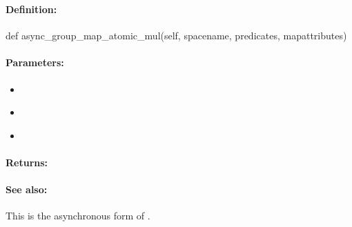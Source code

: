 \pagebreak
\subsubsection{}
\label{api:python:async_group_map_atomic_mul}


\paragraph{Definition:}
\begin{pythoncode}
def async_group_map_atomic_mul(self, spacename, predicates, mapattributes)
\end{pythoncode}

\paragraph{Parameters:}
\begin{itemize}[noitemsep]
\item {}\\

\item {}\\

\item {}\\

\end{itemize}

\paragraph{Returns:}


\paragraph{See also:}  This is the asynchronous form of .

\pagebreak
\subsubsection{}
\label{api:python:map_atomic_div}


